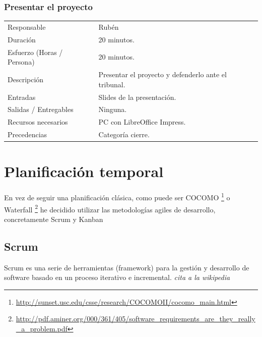 \subsubsection{Presentar el proyecto}
\begin{table}[H]
    \begin{center}
        \begin{tabular}{l p{8cm}}
            Responsable                           & Rub\'{e}n \\
            Duraci\'{o}n                          & 20 minutos. \\ 
            Esfuerzo (Horas / Persona)            & 20 minutos. \\
            Descripci\'{o}n                       & Presentar el proyecto y defenderlo ante el tribunal. \\
            Entradas                              & Slides de la presentaci\'{o}n.\\
            Salidas / Entregables                 & Ninguna. \\
            Recursos necesarios                   & PC con LibreOffice Impress. \\
            Precedencias                          & Categor\'{i}a cierre. \\
        \end{tabular}
    \end{center}
    
\end{table}


\section{Planificaci\'{o}n temporal}
En vez de seguir una planificación clásica, como puede ser COCOMO \footnote{\url{http://sunset.usc.edu/csse/research/COCOMOII/cocomo_main.html}} o Waterfall \footnote{\url{http://pdf.aminer.org/000/361/405/software_requirements_are_they_really_a_problem.pdf}} he decidido utilizar las metodologías agiles de desarrollo, concretamente Scrum y Kanban

\subsection{Scrum}
Scrum es una serie de herramientas (framework) para la gestión y desarrollo de software basado en un proceso iterativo e incremental. \emph{cita a la wikipedia}

